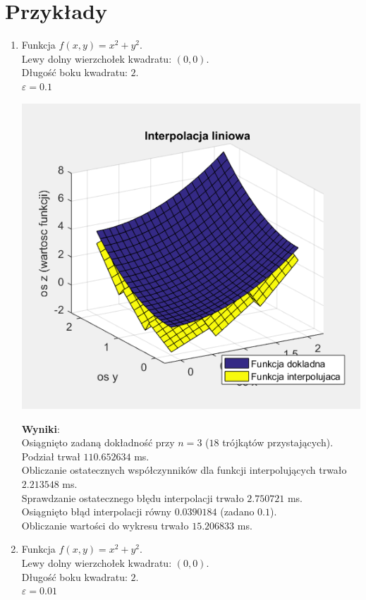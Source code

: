 \documentclass[12pt]{article}
\begin{document}
	\section{Przykłady}
	\begin{enumerate}[label=\textbf{Przykład \arabic*}]
		\item
		Funkcja $f(x, y) = x^2 + y^2$.\\
		Lewy dolny wierzchołek kwadratu: $(0, 0)$.\\
		Długość boku kwadratu: $2$.\\
		$\varepsilon = 0.1$
		
		\includegraphics[]{images/example-1.png}
		
		\textbf{Wyniki}:\\
		Osiągnięto zadaną dokładność przy $n = 3$ ($18$ trójkątów przystających).\\
		Podział trwał $110.652634$ ms.\\
		Obliczanie ostatecznych współczynników dla funkcji interpolujących trwało $2.213548$ ms.\\
		Sprawdzanie ostatecznego błędu interpolacji trwało $2.750721$ ms.\\
		Osiągnięto błąd interpolacji równy $0.0390184$ (zadano $0.1$).\\
		Obliczanie wartości do wykresu trwało $15.206833$ ms.
		
		
		
		\item
		Funkcja $f(x, y) = x^2 + y^2$.\\
		Lewy dolny wierzchołek kwadratu: $(0, 0)$.\\
		Długość boku kwadratu: $2$.\\
		$\varepsilon = 0.01$
		

\end{enumerate}
\end{document}

